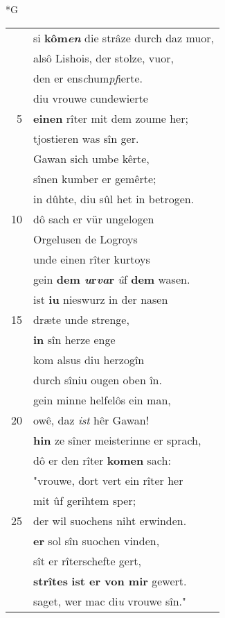 \documentclass[8pt,a4paper,notitlepage]{article}
\begin{document}
\begin{table}[ht]
\begin{minipage}[t]{0.5\linewidth}
\small
\begin{center}*G
\end{center}
\begin{tabular}{rl}
 & si \textbf{kôm\textit{en}} die strâze durch daz muor,\\ 
 & alsô Lishois, der stolze, vuor,\\ 
 & den er ens\textit{c}hum\textit{pf}ierte.\\ 
 & diu vrouwe cundewierte\\ 
5 & \textbf{einen} rîter mit dem zoume her;\\ 
 & tjostieren was sîn ger.\\ 
 & Gawan sich umbe kêrte,\\ 
 & sînen kumber er gemêrte;\\ 
 & in dûhte, diu sûl het in betrogen.\\ 
10 & dô sach er vür ungelogen\\ 
 & Orgelusen de Logroys\\ 
 & unde einen rîter kurtoys\\ 
 & gein \textbf{dem \textit{u}r\textit{va}r} \textit{û}f \textbf{dem} wasen.\\ 
 & ist \textbf{iu} nieswurz in der nasen\\ 
15 & dræte unde strenge,\\ 
 & \textbf{in} sîn herze enge\\ 
 & kom alsus diu herzogîn\\ 
 & durch sîniu ougen oben în.\\ 
 & gein minne helfelôs ein man,\\ 
20 & owê, daz \textit{ist} hêr Gawan!\\ 
 & \textbf{hin} ze sîner meisterinne er sprach,\\ 
 & dô er den rîter \textbf{komen} sach:\\ 
 & "vrouwe, dort vert ein rîter her\\ 
 & mit ûf gerihtem sper;\\ 
25 & der wil suochens niht erwinden.\\ 
 & \textbf{er} sol sîn suochen vinden,\\ 
 & sît er rîterschefte gert,\\ 
 & \textbf{strîtes} \textbf{ist er von mir} gewert.\\ 
 & saget, wer mac di\textit{u} vrouwe sîn."\\ 

\end{tabular}
\end{minipage}
\end{table}
\end{document}

